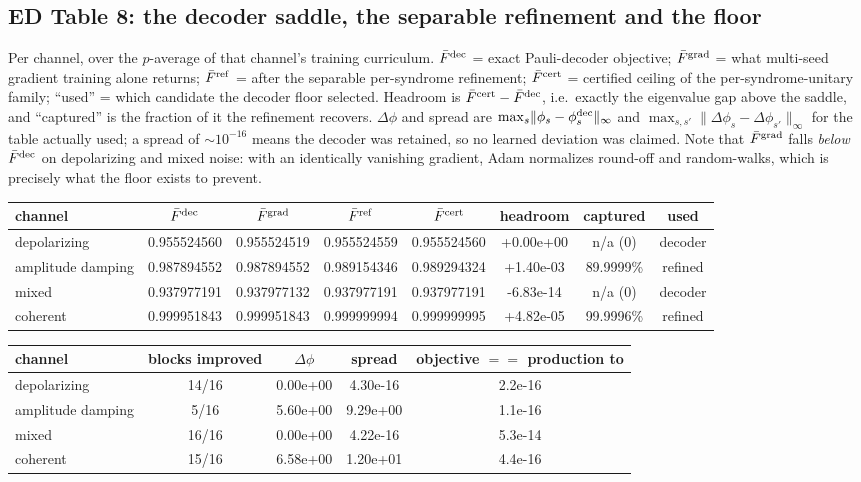 \documentclass[10pt,a4paper]{article}
\begin{document}
\subsection*{ED Table 8: the decoder saddle, the separable refinement and the floor}
Per channel, over the $p$-average of that channel's training curriculum.
$\bar F^{\rm dec}$ = exact Pauli-decoder objective; $\bar F^{\rm grad}$ = what
multi-seed gradient training alone returns; $\bar F^{\rm ref}$ = after the
separable per-syndrome refinement; $\bar F^{\rm cert}$ = certified ceiling of the
per-syndrome-unitary family; ``used'' = which candidate the decoder floor
selected. Headroom is $\bar F^{\rm cert}-\bar F^{\rm dec}$, i.e.\ exactly the
eigenvalue gap above the saddle, and ``captured'' is the fraction of it the
refinement recovers. $\Delta\phi$ and spread are
$\max_s\lVert\phi_s-\phi^{\rm dec}_s\rVert_\infty$ and
$\max_{s,s'}\lVert\Delta\phi_s-\Delta\phi_{s'}\rVert_\infty$ for the table
actually used; a spread of $\sim10^{-16}$ means the decoder was retained, so no
learned deviation was claimed. Note that $\bar F^{\rm grad}$ falls \emph{below}
$\bar F^{\rm dec}$ on depolarizing and mixed noise: with an identically vanishing
gradient, Adam normalizes round-off and random-walks, which is precisely what the
floor exists to prevent.
\begin{longtable}{lccccccc}
\toprule channel & $\bar F^{\rm dec}$ & $\bar F^{\rm grad}$ & $\bar F^{\rm ref}$ & $\bar F^{\rm cert}$ & headroom & captured & used \\ \midrule
depolarizing & 0.955524560 & 0.955524519 & 0.955524559 & 0.955524560 & +0.00e+00 & n/a ($0$) & decoder \\
amplitude damping & 0.987894552 & 0.987894552 & 0.989154346 & 0.989294324 & +1.40e-03 & 89.9999\% & refined \\
mixed & 0.937977191 & 0.937977132 & 0.937977191 & 0.937977191 & -6.83e-14 & n/a ($0$) & decoder \\
coherent & 0.999951843 & 0.999951843 & 0.999999994 & 0.999999995 & +4.82e-05 & 99.9996\% & refined \\
\bottomrule\end{longtable}
\begin{longtable}{lcccc}
\toprule channel & blocks improved & $\Delta\phi$ & spread & objective $==$ production to \\ \midrule
depolarizing & 14/16 & 0.00e+00 & 4.30e-16 & 2.2e-16 \\
amplitude damping & 5/16 & 5.60e+00 & 9.29e+00 & 1.1e-16 \\
mixed & 16/16 & 0.00e+00 & 4.22e-16 & 5.3e-14 \\
coherent & 15/16 & 6.58e+00 & 1.20e+01 & 4.4e-16 \\
\bottomrule\end{longtable}
\end{document}
